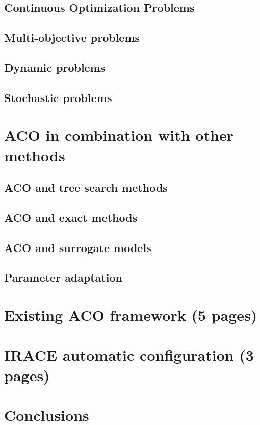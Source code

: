 \documentclass[12pt]{article}
\begin{document}
\subsection{Continuous Optimization Problems}

\subsection{Multi-objective problems}

\subsection{Dynamic problems}

\subsection{Stochastic problems}

\section{ACO in combination with other methods}

\subsection{ACO and tree search methods}

\subsection{ACO and exact methods}

\subsection{ACO and surrogate models}

\subsection{Parameter adaptation}

\section{Existing ACO framework (5 pages)}

\section{IRACE automatic configuration (3 pages)}

\section{Conclusions}

\begin{thebibliography}{1}

\end{thebibliography}
\end{document}
